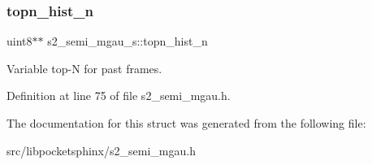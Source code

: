 \subsubsection{topn\+\_\+hist\+\_\+n}
{\footnotesize\ttfamily uint8$\ast$$\ast$ s2\+\_\+semi\+\_\+mgau\+\_\+s\+::topn\+\_\+hist\+\_\+n}



Variable top-\/N for past frames. 



Definition at line 75 of file s2\+\_\+semi\+\_\+mgau.\+h.



The documentation for this struct was generated from the following file\+:\begin{DoxyCompactItemize}
\item 
src/libpocketsphinx/s2\+\_\+semi\+\_\+mgau.\+h\end{DoxyCompactItemize}

